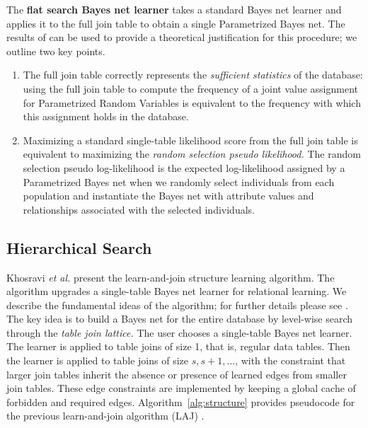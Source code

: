 \documentclass{article}
\begin{document}
The \textbf{flat search Bayes net learner} takes a standard Bayes net learner and applies it to the full join table to obtain a single Parametrized Bayes net.
 The results of \cite{Schulte2011} can be used to provide a theoretical justification for this procedure;
 we outline two key points. \begin{enumerate} \item The full join table correctly represents the {\em sufficient statistics}\cite{Heckerman1995,Schulte2011} of the database: 
using the full join table to compute the frequency of a joint value assignment for Parametrized Random Variables is equivalent to the frequency with which this assignment holds in the database. 
\item Maximizing a standard single-table likelihood score from the full join table is equivalent to maximizing the {\em random selection pseudo likelihood.} 
The random selection pseudo log-likelihood is the expected log-likelihood assigned by a Parametrized Bayes net when we randomly select individuals from each population and instantiate the Bayes net with attribute values and relationships associated with the selected individuals. 
\end{enumerate}

\subsection{Hierarchical Search}
Khosravi {\em et al.} \cite{Schulte2012} present the learn-and-join  structure learning algorithm. 
The algorithm upgrades a single-table Bayes net learner for relational learning. 
We describe the fundamental ideas of the algorithm; for further details please see \cite{Schulte2012}. 
The key idea is to build a Bayes net for the entire database by level-wise search through the {\em table join lattice.} The user chooses a single-table Bayes net learner. The learner is applied to table joins of size 1, that is, regular data tables. Then the learner is applied to table joins of size $s,s+1,\ldots$, with the constraint that larger join tables inherit the absence or presence of learned edges from smaller join tables. These edge constraints are implemented by keeping a global cache of forbidden and required edges.  Algorithm~\ref{alg:structure} provides pseudocode for the previous learn-and-join algorithm (LAJ) \cite{Schulte2012c}. 
\end{document}
